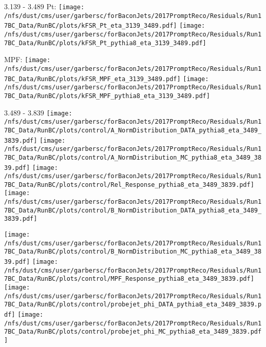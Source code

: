 \documentclass[t,compress]{beamer}
\begin{document}
\begin{frame}{3.139 - 3.489}
	 Pt: \texttt{[image: /nfs/dust/cms/user/garbersc/forBaconJets/2017PromptReco/Residuals/Run17BC\_Data/RunBC/plots/kFSR\_Pt\_eta\_3139\_3489.pdf]}
	\texttt{[image: /nfs/dust/cms/user/garbersc/forBaconJets/2017PromptReco/Residuals/Run17BC\_Data/RunBC/plots/kFSR\_Pt\_pythia8\_eta\_3139\_3489.pdf]}
\newline

	 MPF: \texttt{[image: /nfs/dust/cms/user/garbersc/forBaconJets/2017PromptReco/Residuals/Run17BC\_Data/RunBC/plots/kFSR\_MPF\_eta\_3139\_3489.pdf]}
	\texttt{[image: /nfs/dust/cms/user/garbersc/forBaconJets/2017PromptReco/Residuals/Run17BC\_Data/RunBC/plots/kFSR\_MPF\_pythia8\_eta\_3139\_3489.pdf]}
\end{frame}

\begin{frame}{3.489 - 3.839}
	\texttt{[image: /nfs/dust/cms/user/garbersc/forBaconJets/2017PromptReco/Residuals/Run17BC\_Data/RunBC/plots/control/A\_NormDistribution\_DATA\_pythia8\_eta\_3489\_3839.pdf]}
	\texttt{[image: /nfs/dust/cms/user/garbersc/forBaconJets/2017PromptReco/Residuals/Run17BC\_Data/RunBC/plots/control/A\_NormDistribution\_MC\_pythia8\_eta\_3489\_3839.pdf]}
	\texttt{[image: /nfs/dust/cms/user/garbersc/forBaconJets/2017PromptReco/Residuals/Run17BC\_Data/RunBC/plots/control/Rel\_Response\_pythia8\_eta\_3489\_3839.pdf]}
	\texttt{[image: /nfs/dust/cms/user/garbersc/forBaconJets/2017PromptReco/Residuals/Run17BC\_Data/RunBC/plots/control/B\_NormDistribution\_DATA\_pythia8\_eta\_3489\_3839.pdf]}
\newline

	\texttt{[image: /nfs/dust/cms/user/garbersc/forBaconJets/2017PromptReco/Residuals/Run17BC\_Data/RunBC/plots/control/B\_NormDistribution\_MC\_pythia8\_eta\_3489\_3839.pdf]}
	\texttt{[image: /nfs/dust/cms/user/garbersc/forBaconJets/2017PromptReco/Residuals/Run17BC\_Data/RunBC/plots/control/MPF\_Response\_pythia8\_eta\_3489\_3839.pdf]}
	\texttt{[image: /nfs/dust/cms/user/garbersc/forBaconJets/2017PromptReco/Residuals/Run17BC\_Data/RunBC/plots/control/probejet\_phi\_DATA\_pythia8\_eta\_3489\_3839.pdf]}
	\texttt{[image: /nfs/dust/cms/user/garbersc/forBaconJets/2017PromptReco/Residuals/Run17BC\_Data/RunBC/plots/control/probejet\_phi\_MC\_pythia8\_eta\_3489\_3839.pdf]}
\end{frame}
\end{document}

